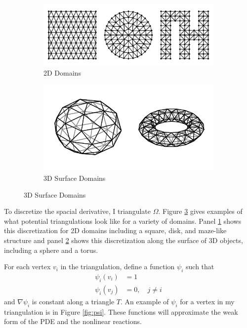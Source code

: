 \begin{figure}[t!]
    \centering
    \caption{Triangulations of different domains}

    \begin{subfigure}{\textwidth}
        \centering
        \includegraphics{figures/2dtris.pdf}
        \caption{2D Domains}
        \label{subfig:2dtris}
    \end{subfigure}

    \begin{subfigure}{\textwidth}
        \centering
        \includegraphics{figures/3dtris.pdf}
        \caption{3D Surface Domains}
        \label{subfig:3dtris}
    \end{subfigure}

    \label{fig:tris}
\end{figure}

To discretize the spacial derivative, I triangulate $\Omega$. Figure \ref{fig:tris} gives examples of what potential triangulations look like for a variety of domains. Panel \ref{subfig:2dtris} shows this discretization for 2D domains including a square, disk, and maze-like structure and panel \ref{subfig:3dtris} shows this discretization along the surface of 3D objects, including a sphere and a torus.

For each vertex $v_i$ in the triangulation, define a function $\psi_i$ such that
\begin{align*}
    \psi_i (v_i) &= 1 \\
    \psi_i (v_j) &= 0, \quad j \neq i
\end{align*}
and $\nabla \psi_i$ is constant along a triangle $T$. An example of $\psi_i$ for a vertex in my triangulation is in Figure \ref{fig:psi}. These functions will approximate the weak form of the PDE and the nonlinear reactions.

